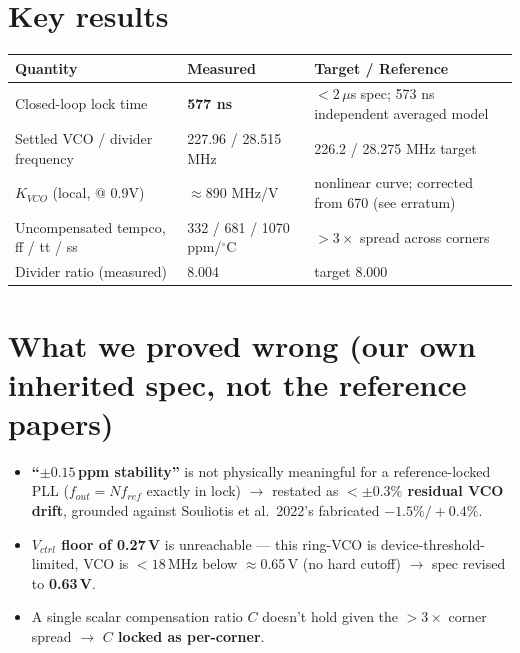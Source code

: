\documentclass[10pt]{article}
\begin{document}
\section{Key results}
\begin{center}
\small
\begin{tabular}{lll}
\toprule
\textbf{Quantity} & \textbf{Measured} & \textbf{Target / Reference} \\
\midrule
Closed-loop lock time & \textbf{577 ns} & $<2\,\mu$s spec; 573 ns independent averaged model \\
Settled VCO / divider frequency & 227.96 / 28.515 MHz & 226.2 / 28.275 MHz target \\
$K_{VCO}$ (local, @ 0.9V) & $\approx$890 MHz/V & nonlinear curve; corrected from 670 (see erratum) \\
Uncompensated tempco, ff / tt / ss & 332 / 681 / 1070 ppm/$^\circ$C & $>3\times$ spread across corners \\
Divider ratio (measured) & 8.004 & target 8.000 \\
\bottomrule
\end{tabular}
\end{center}

\section{What we proved wrong (our own inherited spec, not the reference papers)}
\begin{itemize}[leftmargin=1.3em, itemsep=1pt]
  \item \textbf{``$\pm0.15$\,ppm stability''} is not physically meaningful for a reference-locked PLL ($f_{out}=N f_{ref}$ exactly in lock) $\to$ restated as \textbf{$<\pm0.3\%$ residual VCO drift}, grounded against Souliotis et al.\ 2022's fabricated $-1.5\%/+0.4\%$.
  \item \textbf{$V_{ctrl}$ floor of 0.27\,V} is unreachable --- this ring-VCO is device-threshold-limited, VCO is $<18$\,MHz below $\approx$0.65\,V (no hard cutoff) $\to$ spec revised to \textbf{0.63\,V}.
  \item A single scalar compensation ratio $C$ doesn't hold given the $>3\times$ corner spread $\to$ \textbf{$C$ locked as per-corner}.
\end{itemize}
\end{document}
